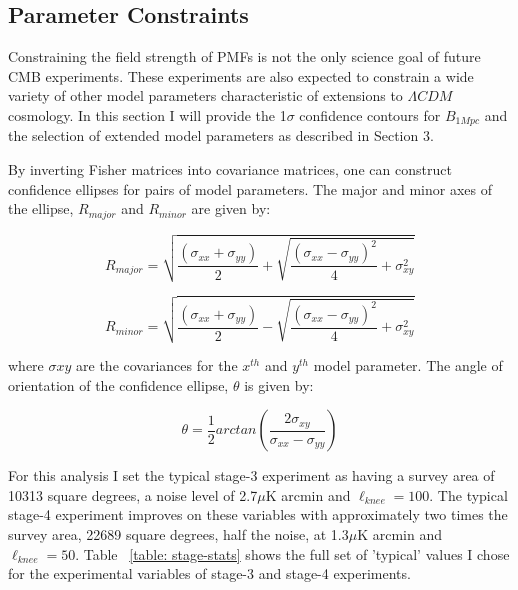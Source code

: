 \pagebreak
\subsection{Parameter Constraints}

Constraining the field strength of PMFs is not the only science goal of future CMB experiments. These experiments are also expected to constrain a wide variety of other model parameters characteristic of extensions to $\Lambda CDM$ cosmology. In this section I will provide the 1$\sigma$ confidence contours for $B_{1Mpc}$ and the selection of extended model parameters as described in Section 3.

By inverting Fisher matrices into covariance matrices, one can construct confidence ellipses for pairs of model parameters. The major and minor axes of the ellipse, $R_{major}$ and $R_{minor}$ are given by:

\begin{equation}
R_{major} = \sqrt{\frac{(\sigma_{xx} + \sigma_{yy})}{2} + \sqrt{\frac{(\sigma_{xx} - \sigma_{yy})^2}{4} + \sigma_{xy}^2}}
\end{equation}

\begin{equation}
R_{minor} = \sqrt{\frac{(\sigma_{xx} + \sigma_{yy})}{2} - \sqrt{\frac{(\sigma_{xx} - \sigma_{yy})^2}{4} + \sigma_{xy}^2}}
\end{equation}

where $\sigma{xy}$ are the covariances for the $x^{th}$ and $y^{th}$ model parameter. The angle of orientation of the confidence ellipse, $\theta$ is given by:

\begin{equation}
\theta = \frac{1}{2}arctan(\frac{2\sigma_{xy}}{\sigma_{xx}-\sigma_{yy}})
\end{equation}

For this analysis I set the typical stage-3 experiment as having a survey area of 10313 square degrees, a noise level of 2.7$\mu$K arcmin and $\ell_{knee} = 100$. The typical stage-4 experiment improves on these variables with approximately two times the survey area, 22689 square degrees, half the noise, at 1.3$\mu$K arcmin and $\ell_{knee} = 50$. Table ~\ref{table: stage-stats} shows the full set of 'typical' values I chose for the experimental variables of stage-3 and stage-4 experiments.

